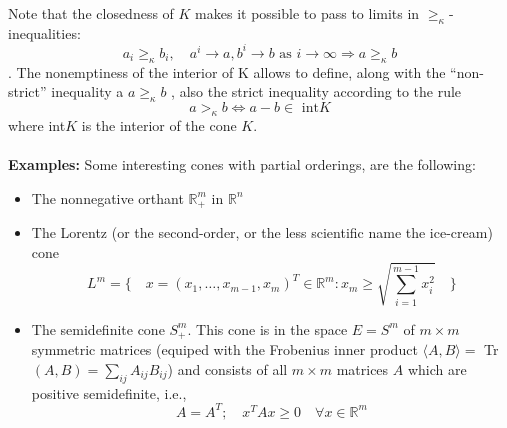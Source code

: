 \documentclass[12pt]{article}
\newcommand{\R}{\mathbb{R}}
\begin{document}
Note that the closedness of $K$ makes it possible to pass to limits in $\geq_{\kappa}$-inequalities: $$a_i \geq_{\kappa} b_i,\quad a^i \rightarrow a, b^i \rightarrow b \text{ as } i \rightarrow \infty \Rightarrow a \geq_{\kappa} b $$.
The nonemptiness of the interior of K allows to define, along with the “non-strict” inequality a $a \geq_{\kappa} b$ , also the strict inequality according to the rule 
$$ a > _\kappa b \Leftrightarrow a-b \in \text{ int} K$$
where int$K$ is the interior of the cone $K$. \\ \\
\textbf{Examples:} Some interesting cones with partial orderings, are the following: 
\begin{itemize}
\item The nonnegative orthant $\R^m_{+}$ in $\R^n$
\item The Lorentz (or the second-order, or the less scientific name the ice-cream) cone
$$L^m =\Bigg\{ \quad  x = (x_1, \ldots, x_{m-1}, x_m)^T \in \R^m : x_m \geq \sqrt{\sum^{m-1}_{i =1}x^2_i} \quad \Bigg\}$$
\item The semidefinite cone $S_+^m$. This cone is in the space $E = S^m$ of $m\times m$ symmetric matrices (equiped with the Frobenius inner product $\langle A, B \rangle =$ Tr$(A,B) = \sum_{ij}A_{ij}B_{ij}$) and consists of all $m \times m$ matrices $A$ which are positive semidefinite, i.e.,
$$A = A^T; \quad x^T Ax \geq 0 \quad \forall x \in \R^m $$

\end{itemize}
    \newpage
\end{document}
